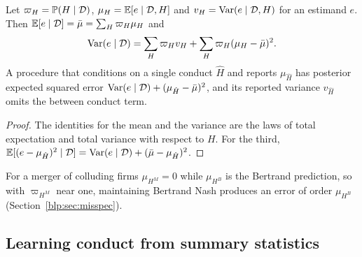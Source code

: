 \begin{proposition}\label{blp:prop:bma}
Let $\varpi_H = \mathbb{P}(H\mid\mathcal{D})$, $\mu_H = \mathbb{E}[e\mid\mathcal{D},H]$ and $v_H = \mathrm{Var}(e\mid\mathcal{D},H)$ for
an estimand $e$. Then $\mathbb{E}[e\mid\mathcal{D}] = \bar\mu = \sum_H\varpi_H\mu_H$ and
\[
\mathrm{Var}(e\mid\mathcal{D}) = \sum_H \varpi_H v_H + \sum_H\varpi_H(\mu_H-\bar\mu)^2 .
\]
A procedure that conditions on a single conduct $\hat H$ and reports $\mu_{\hat H}$ has posterior
expected squared error $\mathrm{Var}(e\mid\mathcal{D}) + (\mu_{\hat H}-\bar\mu)^2$, and its reported variance
$v_{\hat H}$ omits the between conduct term.
\end{proposition}
\begin{proof}
The identities for the mean and the variance are the laws of total expectation and total variance with respect to $H$.
For the third, $\mathbb{E}[(e-\mu_{\hat H})^2\mid\mathcal{D}] = \mathrm{Var}(e\mid\mathcal{D}) +
(\bar\mu-\mu_{\hat H})^2$.
\end{proof}

For a merger of
colluding firms $\mu_{H^M} = 0$ while $\mu_{H^B}$ is the Bertrand prediction, so with
$\varpi_{H^M}$ near one, maintaining Bertrand Nash produces an error of order $\mu_{H^B}$
(Section~\ref{blp:sec:misspec}).

\subsection{Learning conduct from summary statistics}

